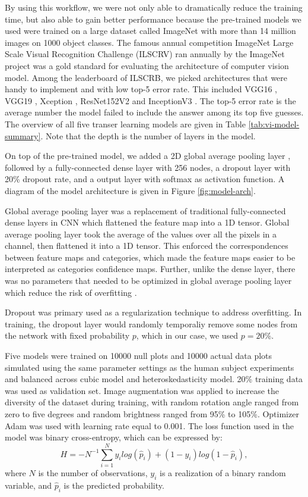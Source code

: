 \documentclass{monashthesis}
\theoremstyle{definition}
\theoremstyle{definition}
\theoremstyle{definition}
\theoremstyle{definition}
\theoremstyle{remark}
\begin{document}
By using this workflow, we were not only able to dramatically reduce the training time, but also able to gain better performance because the pre-trained models we used were trained on a large dataset called ImageNet \autocite{deng_imagenet_2009} with more than 14 million images on 1000 object classes. The famous annual competition ImageNet Large Scale Visual Recognition Challenge (ILSCRV) ran annually by the ImageNet project was a gold standard for evaluating the architecture of computer vision model. Among the leaderboard of ILSCRB, we picked architectures that were handy to implement and with low top-5 error rate. This included VGG16 \autocite{simonyan_very_2015}, VGG19 \autocite{simonyan_very_2015}, Xception \autocite{chollet_xception_2017}, ResNet152V2 \autocite{he_identity_2016} and InceptionV3 \autocite{szegedy_rethinking_2015}. The top-5 error rate is the average number the model failed to include the answer among its top five guesses. The overview of all five transer learning models are given in Table \ref{tab:vi-model-summary}. Note that the depth is the number of layers in the model.

On top of the pre-trained model, we added a 2D global average pooling layer \autocite{lin_network_2014}, followed by a fully-connected dense layer with 256 nodes, a dropout layer \autocite{srivastava_dropout_nodate} with 20\% dropout rate, and a output layer with softmax as activation function. A diagram of the model architecture is given in Figure \ref{fig:model-arch}.

Global average pooling layer was a replacement of traditional fully-connected dense layers in CNN which flattened the feature map into a 1D tensor. Global average pooling layer took the average of the values over all the pixels in a channel, then flattened it into a 1D tensor. This enforced the correspondences between feature maps and categories, which made the feature maps easier to be interpreted as categories confidence maps. Further, unlike the dense layer, there was no parameters that needed to be optimized in global average pooling layer which reduce the risk of overfitting \autocite{lin_network_2014}.

Dropout was primary used as a regularization technique to address overfitting. In training, the dropout layer would randomly temporaliy remove some nodes from the network with fixed probability \(p\), which in our case, we used \(p = 20\)\%.

Five models were trained on 10000 null plots and 10000 actual data plots simulated using the same parameter settings as the human subject experiments and balanced across cubic model and heteroskedasticity model. 20\% training data was used as validation set. Image augmentation was applied to increase the diversity of the dataset during training, with random rotation angle ranged from zero to five degrees and random brightness ranged from 95\% to 105\%. Optimizer Adam \autocite{kingma_adam_2017} was used with learning rate equal to 0.001. The loss function used in the model was binary cross-entropy, which can be expressed by: \[H = -N^{-1}\sum_{i=1}^{N}y_ilog(\hat{p}_i)+(1-y_i)log(1-\hat{p}_i),\] where \(N\) is the number of observations, \(y_i\) is a realization of a binary random variable, and \(\hat{p}_i\) is the predicted probability.
\end{document}
